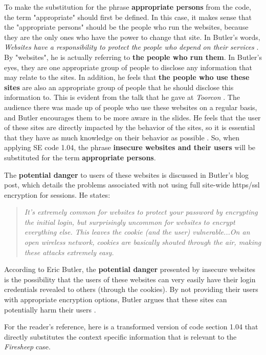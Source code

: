 \documentclass[11pt]{article}
\begin{document}
\begin{multicols}{2}
To make the substitution for the phrase \textbf{appropriate persons} from the code, the term "appropriate" should first be defined. In this case, it makes sense that the "appropriate persons" should be the people who run the websites, because they are the only ones who have the power to change that site. In Butler's words, \emph{Websites have a responsibility to protect the people who depend on their services} \cite{codebutler_main}. By "websites", he is actually referring to \textbf{the people who run them}. In Butler's eyes, they are one appropriate group of people to disclose any information that may relate to the sites. In addition, he feels that \textbf{the people who use these sites} are also an appropriate group of people that he should disclose this information to. This is evident from the talk that he gave at \emph{Toorcon} \cite{toorcon_slides}. The audience there was made up of people who use these websites on a regular basis, and Butler encourages them to be more aware in the slides. He feels that the user of these sites are directly impacted by the behavior of the sites, so it is essential that they have as much knowledge on their behavior as possible \cite{toorcon_slides}. So, when applying SE code 1.04, the phrase \textbf{insecure websites and their users} will be substituted for the term \textbf{appropriate persons}.

The \textbf{potential danger} to users of these websites is discussed in Butler's blog post, which details the problems associated with not using full site-wide https/ssl encryption for sessions. He states:

\begin{quote}
  \emph{It's extremely common for websites to protect your password by encrypting the initial login, but surprisingly uncommon for websites to encrypt everything else. This leaves the cookie (and the user) vulnerable...On an open wireless network, cookies are basically shouted through the air, making these attacks extremely easy.} \cite{codebutler_main}
\end{quote}

According to Eric Butler, the \textbf{potential danger} presented by insecure websites is the possibility that the users of these websites can very easily have their login credentials revealed to others (through the cookies).
By not providing their users with appropriate encryption options, Butler argues that these sites can potentially harm their users \cite{codebutler_main}.

For the reader's reference, here is a transformed version of code section 1.04 that directly substitutes the context specific information that is relevant to the \emph{Firesheep} case.


\end{multicols}
\end{document}
